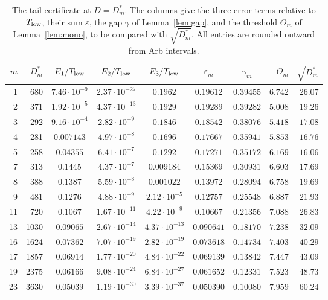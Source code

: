 \documentclass[11pt]{amsart}
\theoremstyle{definition}
\begin{document}
\begin{table}[ht]\centering
\caption{The tail certificate at $D=D^*_m$. The columns give the three error terms relative to $T_{\rm low}$, their sum $\varepsilon$, the gap $\gamma$ of Lemma~\ref{lem:gap}, and the threshold $\Theta_m$ of Lemma~\ref{lem:mono}, to be compared with $\sqrt{D^*_m}$. All entries are rounded outward from Arb intervals.}\label{tab:tail}
\small
\begin{tabular}{rrcccccrr}
\toprule
$m$ & $D^*_m$ & $E_1/T_{\rm low}$ & $E_2/T_{\rm low}$ & $E_3/T_{\rm low}$ & $\varepsilon_m$ & $\gamma_m$ & $\Theta_m$ & $\sqrt{D^*_m}$\\
\midrule
1 & 680 & $7.46\cdot10^{-9}$ & $2.37\cdot10^{-27}$ & $0.1962$ & $0.19612$ & $0.39455$ & $6.742$ & $26.07$\\
2 & 371 & $1.92\cdot10^{-5}$ & $4.37\cdot10^{-13}$ & $0.1929$ & $0.19289$ & $0.39282$ & $5.008$ & $19.26$\\
3 & 292 & $9.16\cdot10^{-4}$ & $2.82\cdot10^{-9}$ & $0.1846$ & $0.18542$ & $0.38076$ & $5.418$ & $17.08$\\
4 & 281 & $0.007143$ & $4.97\cdot10^{-8}$ & $0.1696$ & $0.17667$ & $0.35941$ & $5.853$ & $16.76$\\
5 & 258 & $0.04355$ & $6.41\cdot10^{-7}$ & $0.1292$ & $0.17271$ & $0.35172$ & $6.169$ & $16.06$\\
7 & 313 & $0.1445$ & $4.37\cdot10^{-7}$ & $0.009184$ & $0.15369$ & $0.30931$ & $6.603$ & $17.69$\\
8 & 388 & $0.1387$ & $5.59\cdot10^{-8}$ & $0.001022$ & $0.13972$ & $0.28094$ & $6.758$ & $19.69$\\
9 & 481 & $0.1276$ & $4.88\cdot10^{-9}$ & $2.12\cdot10^{-5}$ & $0.12757$ & $0.25548$ & $6.887$ & $21.93$\\
11 & 720 & $0.1067$ & $1.67\cdot10^{-11}$ & $4.22\cdot10^{-9}$ & $0.10667$ & $0.21356$ & $7.088$ & $26.83$\\
13 & 1030 & $0.09065$ & $2.67\cdot10^{-14}$ & $4.37\cdot10^{-13}$ & $0.090641$ & $0.18170$ & $7.238$ & $32.09$\\
16 & 1624 & $0.07362$ & $7.07\cdot10^{-19}$ & $2.82\cdot10^{-19}$ & $0.073618$ & $0.14734$ & $7.403$ & $40.29$\\
17 & 1857 & $0.06914$ & $1.77\cdot10^{-20}$ & $4.84\cdot10^{-22}$ & $0.069139$ & $0.13842$ & $7.447$ & $43.09$\\
19 & 2375 & $0.06166$ & $9.08\cdot10^{-24}$ & $6.84\cdot10^{-27}$ & $0.061652$ & $0.12331$ & $7.523$ & $48.73$\\
23 & 3630 & $0.05039$ & $1.19\cdot10^{-30}$ & $3.39\cdot10^{-37}$ & $0.050390$ & $0.10080$ & $7.959$ & $60.24$\\

\end{tabular}
\end{table}
\end{document}
